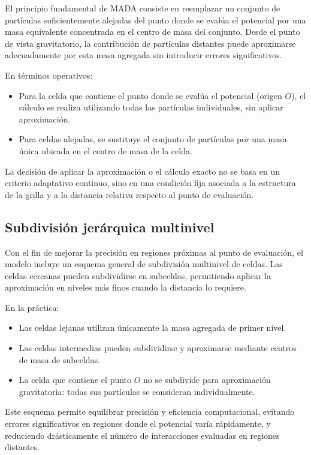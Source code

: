 \documentclass[a4paper,11pt]{book}
\begin{document}
El principio fundamental de MADA consiste en reemplazar un conjunto de partículas suficientemente alejadas del punto donde se evalúa el potencial por una masa equivalente concentrada en el centro de masa del conjunto. Desde el punto de vista gravitatorio, la contribución de partículas distantes puede aproximarse adecuadamente por esta masa agregada sin introducir errores significativos.

En términos operativos:

\begin{itemize}
	\item Para la celda que contiene el punto donde se evalúa el potencial (origen $O$), el cálculo se realiza utilizando todas las partículas individuales, sin aplicar aproximación.
	\item Para celdas alejadas, se sustituye el conjunto de partículas por una masa única ubicada en el centro de masa de la celda.
\end{itemize}

La decisión de aplicar la aproximación o el cálculo exacto no se basa en un criterio adaptativo continuo, sino en una condición fija asociada a la estructura de la grilla y a la distancia relativa respecto al punto de evaluación.

\subsection{Subdivisión jerárquica multinivel}

Con el fin de mejorar la precisión en regiones próximas al punto de evaluación, el modelo incluye un esquema general de subdivisión multinivel de celdas. Las celdas cercanas pueden subdividirse en subceldas, permitiendo aplicar la aproximación en niveles más finos cuando la distancia lo requiere.

En la práctica:

\begin{itemize}
	\item Las celdas lejanas utilizan únicamente la masa agregada de primer nivel.
	\item Las celdas intermedias pueden subdividirse y aproximarse mediante centros de masa de subceldas.
	\item La celda que contiene el punto $O$ no se subdivide para aproximación gravitatoria: todas sus partículas se consideran individualmente.
\end{itemize}

Este esquema permite equilibrar precisión y eficiencia computacional, evitando errores significativos en regiones donde el potencial varía rápidamente, y reduciendo drásticamente el número de interacciones evaluadas en regiones distantes.
\end{document}
